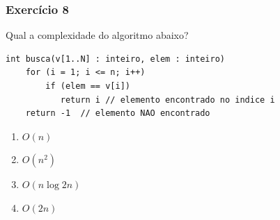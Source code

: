 \documentclass[aspectratio=169]{beamer}
\begin{document}
\begin{frame}[fragile]\frametitle{Exercício 8} %
Qual a complexidade do algoritmo abaixo?
{\scriptsize
\begin{verbatim}
int busca(v[1..N] : inteiro, elem : inteiro)
    for (i = 1; i <= n; i++)
        if (elem == v[i])
           return i // elemento encontrado no indice i
    return -1  // elemento NAO encontrado
\end{verbatim}
}
\begin{enumerate}[A]
	\item $O(n)$ %
	\item $O(n^2)$
	\item $O(n \log 2n)$
	\item $O(2n)$
\end{enumerate}
\end{frame}
\end{document}
